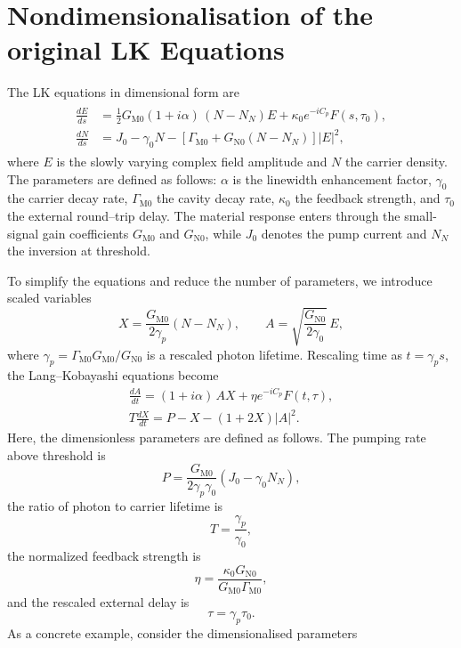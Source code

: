 \section{Nondimensionalisation of the original LK Equations}
\label{app:LK_nondim}
%
\let\cleardoublepage\origcleardoublepage
%
The LK equations in dimensional form are
%
\begin{gather}
\label{eq:dimensionalised_LK}
\begin{aligned}
\frac{d E}{d s} &= \tfrac{1}{2} G_{\mathrm{M}0}(1 + i \alpha)\,(N - N_N) E 
+ \kappa_0 e^{-i C_p} F(s, \tau_0), \\[0.3em]
\frac{d N}{d s} &= J_0 - \gamma_0 N 
- \left[\Gamma_{\mathrm{M}0} + G_{\mathrm{N}0}(N - N_N)\right] |E|^2,
\end{aligned}
\end{gather}
%
where \(E\) is the slowly varying complex field amplitude and \(N\) the carrier density.
The parameters are defined as follows: 
\(\alpha\) is the linewidth enhancement factor, 
\(\gamma_0\) the carrier decay rate, 
\(\Gamma_{\mathrm{M}0}\) the cavity decay rate, 
\(\kappa_0\) the feedback strength, 
and \(\tau_0\) the external round–trip delay. 
The material response enters through the small-signal gain coefficients 
\(G_{\mathrm{M}0}\) and \(G_{\mathrm{N}0}\), 
while \(J_0\) denotes the pump current and \(N_N\) the inversion at threshold.
%
\par
%
To simplify the equations and reduce the number of parameters, we introduce scaled variables
\[
X = \frac{G_{\mathrm{M}0}}{2 \gamma_p}(N - N_N), 
\qquad 
A = \sqrt{\frac{G_{\mathrm{N}0}}{2 \gamma_0}}\, E,
\]
where \( \gamma_p = \Gamma_{\mathrm{M}0} G_{\mathrm{M}0} / G_{\mathrm{N}0} \) is a rescaled photon lifetime. 
Rescaling time as \( t = \gamma_p s \), the Lang–Kobayashi equations become
\[
\begin{gathered}
\frac{d A}{d t} = (1 + i \alpha)\, A X + \eta e^{-i C_p} F(t,\tau), \\[0.3em]
T \frac{d X}{d t} = P - X - (1 + 2X)|A|^2.
\end{gathered}
\]
Here, the dimensionless parameters are defined as follows. 
The pumping rate above threshold is 
\[
P = \frac{G_{\mathrm{M}0}}{2 \gamma_p \gamma_0}(J_0 - \gamma_0 N_N),
\]
the ratio of photon to carrier lifetime is 
\[
T = \frac{\gamma_p}{\gamma_0},
\]
the normalized feedback strength is 
\[
\eta = \frac{\kappa_0 G_{\mathrm{N}0}}{G_{\mathrm{M}0} \Gamma_{\mathrm{M}0}},
\]
and the rescaled external delay is 
\[
\tau = \gamma_p \tau_0.
\]
%
As a concrete example, consider the dimensionalised parameters  
